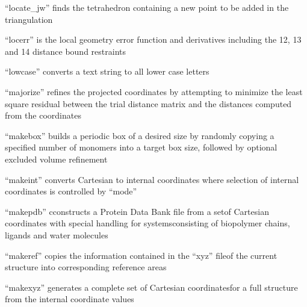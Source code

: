 \documentclass[letterpaper,11pt,english]{sphinxmanual}
\begin{document}
\sphinxAtStartPar
{}

\sphinxAtStartPar
“locate\_jw” finds the tetrahedron containing a new point to be added in the triangulation

\sphinxAtStartPar
{}

\sphinxAtStartPar
“locerr” is the local geometry error function and derivatives including the 1\sphinxhyphen{}2, 1\sphinxhyphen{}3 and 1\sphinxhyphen{}4 distance bound restraints

\sphinxAtStartPar
{}

\sphinxAtStartPar
“lowcase” converts a text string to all lower case letters

\sphinxAtStartPar
{}

\sphinxAtStartPar
“majorize” refines the projected coordinates by attempting to minimize the least square residual between the trial distance matrix and the distances computed from the coordinates

\sphinxAtStartPar
{}

\sphinxAtStartPar
{}

\sphinxAtStartPar
“makebox” builds a periodic box of a desired size by randomly copying a specified number of monomers into a target box size, followed by optional excluded volume refinement

\sphinxAtStartPar
{}

\sphinxAtStartPar
“makeint” converts Cartesian to internal coordinates where selection of internal coordinates is controlled by “mode”

\sphinxAtStartPar
{}

\sphinxAtStartPar
“makepdb” cconstructs a Protein Data Bank file from a setof Cartesian coordinates with special handling for systemsconsisting of biopolymer chains, ligands and water molecules

\sphinxAtStartPar
{}

\sphinxAtStartPar
“makeref” copies the information contained in the “xyz” fileof the current structure into corresponding reference areas

\sphinxAtStartPar
{}

\sphinxAtStartPar
“makexyz” generates a complete set of Cartesian coordinatesfor a full structure from the internal coordinate values
\end{document}
